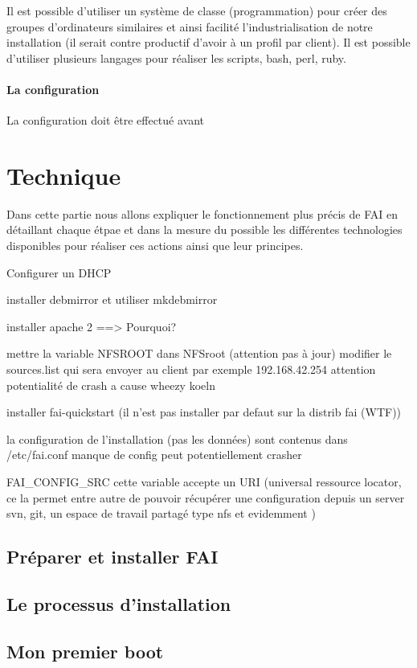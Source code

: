 \documentclass[a4paper,12pt,one side,titlepage]{report}
\begin{document}
Il est possible d'utiliser un système de classe (programmation) pour créer des groupes d'ordinateurs similaires et ainsi facilité l'industrialisation de notre installation (il serait contre productif d'avoir à un profil par client). Il est possible d'utiliser plusieurs langages pour réaliser les scripts, bash, perl, ruby.

\subsubsection{La configuration}
La configuration doit être effectué avant 


\chapter{Technique}
Dans cette partie nous allons expliquer le fonctionnement plus précis de FAI en détaillant chaque étpae et dans la mesure du possible les différentes technologies disponibles pour réaliser ces actions ainsi que leur principes. 


Configurer un DHCP

installer debmirror et utiliser mkdebmirror

installer apache 2 ==> Pourquoi?

mettre la variable NFSROOT dans NFSroot (attention pas à jour)
modifier le sources.list qui sera envoyer au client par exemple 192.168.42.254
attention potentialité de crash a cause wheezy  koeln

installer fai-quickstart (il n'est pas installer par defaut sur la distrib fai (WTF))

la configuration de l'installation (pas les données) sont contenus dans /etc/fai.conf
manque de config peut potentiellement crasher


FAI\_CONFIG\_SRC cette variable accepte un URI (universal ressource locator, ce la permet entre autre de pouvoir récupérer une configuration depuis un server svn, git, un espace de travail partagé type nfs et evidemment )

\section{Préparer et installer FAI}


\section{Le processus d'installation}

\section{Mon premier boot}
\end{document}
